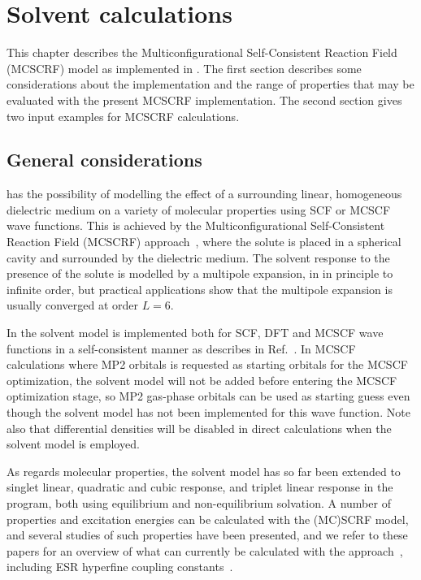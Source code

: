 \chapter{Solvent calculations}\label{ch:solvent}

This chapter describes the 
Multiconfigurational Self-Consistent Reaction Field (MCSCRF) model
as implemented in {\dalton}. The first section describes some
considerations about the implementation  and the range of
properties that may be evaluated with the present MCSCRF
implementation. The second section gives two input examples for
MCSCRF calculations.

\section{General considerations}\label{sec:solventimpl}

{\dalton} has the possibility of modelling the effect of a
surrounding linear, homogeneous dielectric
medium on a variety of molecular properties using
SCF or MCSCF
wave functions. This is achieved by the Multiconfigurational
Self-Consistent Reaction Field
(MCSCRF)
approach~\cite{kvmedpsjpc91,kvmhahjajthjcp89}, where the solute is
placed in a spherical cavity and surrounded by the
dielectric medium. The solvent response to the presence of the
solute is modelled by a multipole 
expansion, in {\dalton} in principle to infinite order, but
practical applications show that the multipole expansion is
usually converged at order $L=6$.

In {\dalton} the solvent model is implemented both for SCF, DFT and MCSCF wave
functions in a self-consistent manner as describes in
Ref.~\cite{kvmedpsjpc91,kvmhahjajthjcp89}. In MCSCF calculations where
MP2 orbitals is requested as starting orbitals for the MCSCF
optimization, the solvent model will not be added before entering the
MCSCF optimization stage, so MP2 gas-phase orbitals can be used as
starting guess even though the solvent model has not been implemented
for this wave function. Note also that differential densities will be
disabled in direct calculations when the solvent model is employed.

As regards molecular properties, the solvent model has so far been
extended to singlet linear, quadratic and cubic response, and  triplet
linear response
in the {\resp} program, both using equilibrium and non-equilibrium
solvation. A number of properties and excitation energies can
be calculated with the (MC)SCRF model, and several studies of such
properties have been presented, and we refer to these papers for an
overview of what can currently be calculated with the
approach~\cite{kvmpjhjajjcp100,kvmylhapjjcp100}, including ESR
hyperfine coupling
constants~\cite{bfocobpjkvmjcp104}.

